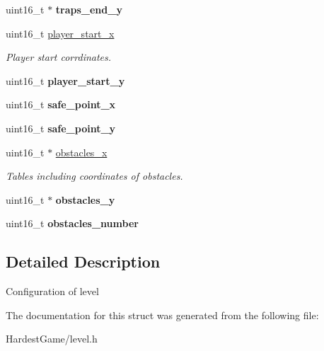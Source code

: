 \begin{DoxyCompactItemize}
\item 
uint16\+\_\+t $\ast$ {\bfseries traps\+\_\+end\+\_\+y}\hypertarget{structlevel__config__t_acf1917e36a5211d7c543baec04aca40e}{}\label{structlevel__config__t_acf1917e36a5211d7c543baec04aca40e}

\item 
uint16\+\_\+t \hyperlink{structlevel__config__t_aec34db8401fb163da225cb0018432792}{player\+\_\+start\+\_\+x}\hypertarget{structlevel__config__t_aec34db8401fb163da225cb0018432792}{}\label{structlevel__config__t_aec34db8401fb163da225cb0018432792}

\begin{DoxyCompactList}\small\item\em Player start corrdinates. \end{DoxyCompactList}\item 
uint16\+\_\+t {\bfseries player\+\_\+start\+\_\+y}\hypertarget{structlevel__config__t_a11650b391194ad73b3139142f9b5b58a}{}\label{structlevel__config__t_a11650b391194ad73b3139142f9b5b58a}

\item 
uint16\+\_\+t {\bfseries safe\+\_\+point\+\_\+x}\hypertarget{structlevel__config__t_a895b66a5d11d35c8c0781922a798fdad}{}\label{structlevel__config__t_a895b66a5d11d35c8c0781922a798fdad}

\item 
uint16\+\_\+t {\bfseries safe\+\_\+point\+\_\+y}\hypertarget{structlevel__config__t_a6e6f2f8db4e824e6e96e4fdf536cb129}{}\label{structlevel__config__t_a6e6f2f8db4e824e6e96e4fdf536cb129}

\item 
uint16\+\_\+t $\ast$ \hyperlink{structlevel__config__t_af1d20b17d289280fe6ac6d6168e7e68e}{obstacles\+\_\+x}\hypertarget{structlevel__config__t_af1d20b17d289280fe6ac6d6168e7e68e}{}\label{structlevel__config__t_af1d20b17d289280fe6ac6d6168e7e68e}

\begin{DoxyCompactList}\small\item\em Tables including coordinates of obstacles. \end{DoxyCompactList}\item 
uint16\+\_\+t $\ast$ {\bfseries obstacles\+\_\+y}\hypertarget{structlevel__config__t_a1c98ec20740fd89a956b2e6cdb5e5033}{}\label{structlevel__config__t_a1c98ec20740fd89a956b2e6cdb5e5033}

\item 
uint16\+\_\+t {\bfseries obstacles\+\_\+number}\hypertarget{structlevel__config__t_a753cfb5156f956bb9296702e9e943763}{}\label{structlevel__config__t_a753cfb5156f956bb9296702e9e943763}

\end{DoxyCompactItemize}


\subsection{Detailed Description}
Configuration of level 

The documentation for this struct was generated from the following file\+:\begin{DoxyCompactItemize}
\item 
Hardest\+Game/level.\+h\end{DoxyCompactItemize}
